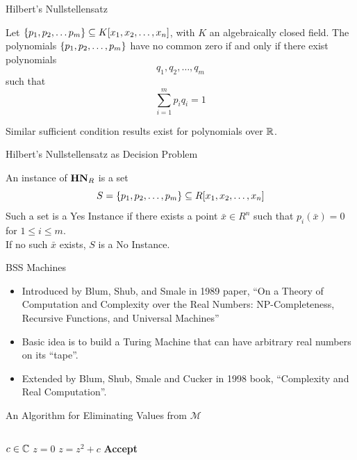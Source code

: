 \documentclass[c]{beamer}
\begin{document}
\begin{frame}{Hilbert's Nullstellensatz}
  
  \begin{theorem}
    
    Let $\{p_1, p_2, \ldots p_m\} \subseteq K[x_1, x_2,\ldots,x_n]$, with $K$ an
    algebraically closed field.  The polynomials $\{p_1, p_2,
      \ldots, p_m\}$ have no common zero if and only if there exist
    polynomials
    $$q_1, q_2, \ldots, q_m$$ such that
    $$\sum_{i=1}^m p_iq_i = 1$$
    
  \end{theorem}\pause
  
  Similar sufficient condition results exist for polynomials over
  $\mathbb{R}$.

\end{frame}

\begin{frame}{Hilbert's Nullstellensatz as Decision Problem}

  An instance of $\mathbf{HN}_R$ is a set 
  $$S = \{p_1, p_2, \ldots, p_m\} \subseteq R[x_1, x_2,\ldots,x_n]$$ 
  Such a set is a Yes Instance if there exists
  a point $\bar{x} \in R^n$ such that $p_i(\bar{x}) = 0$ for $1 \leq i
  \leq m$.  \\

  If no such $\bar{x}$ exists, $S$ is a No Instance.
  
\end{frame}

\begin{frame}{BSS Machines}

  \begin{itemize}
  \item Introduced by Blum, Shub, and Smale in 1989 paper, ``On a
    Theory of Computation and Complexity over the Real Numbers:
    NP-Completeness, Recursive Functions, and Universal Machines''
  \item Basic idea is to build a Turing Machine that can have
    arbitrary real numbers on its ``tape''.
  \item Extended by Blum, Shub, Smale and Cucker in 1998 book,
    ``Complexity and Real Computation''.
  \end{itemize}
  
\end{frame}

\begin{frame}{An Algorithm for Eliminating Values from $\mathcal{M}$}

  \begin{columns}
    \begin{algorithmic}
      \Require $c \in \mathbb{C}$
      \State $z = 0$
      \State $z = z^2 +c$
      \EndWhile
      \State \textbf{Accept}
    \end{algorithmic}

    \begin{center}
      \scaletopagewidth[0.9]{\mandelrecsimple{}}
    \end{center}
  \end{columns}
\end{frame}
\end{document}
